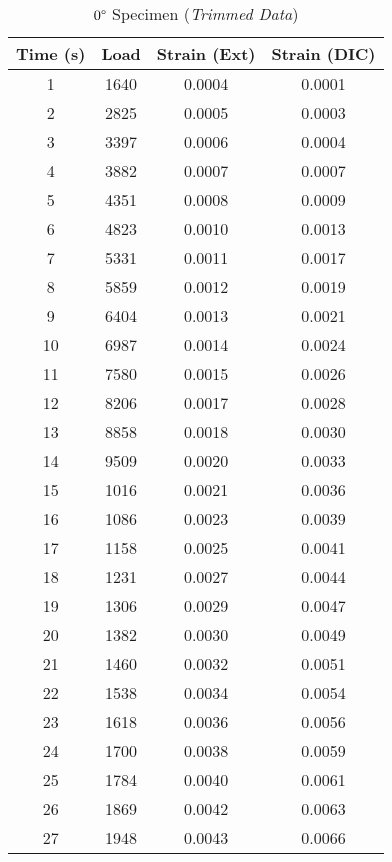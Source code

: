 \begin{table}[!h]
    \centering
    \caption{$0\degree$ Specimen (\textit{Trimmed Data})}
    \begin{tabular}{|c||c|c|c|}\toprule
        \textbf{Time (s)} & \textbf{Load} & \textbf{Strain (Ext)} & \textbf{Strain (DIC)}\\\midrule
        1 & 1640 & 0.0004 & 0.0001 \\\hline
        2 & 2825 & 0.0005 & 0.0003 \\\hline
        3 & 3397 & 0.0006 & 0.0004 \\\hline
        4 & 3882 & 0.0007 & 0.0007 \\\hline
        5 & 4351 & 0.0008 & 0.0009 \\\hline
        6 & 4823 & 0.0010 & 0.0013 \\\hline
        7 & 5331 & 0.0011 & 0.0017 \\\hline
        8 & 5859 & 0.0012 & 0.0019 \\\hline
        9 & 6404 & 0.0013 & 0.0021 \\\hline
        10 & 6987 & 0.0014 & 0.0024 \\\hline
        11 & 7580 & 0.0015 & 0.0026 \\\hline
        12 & 8206 & 0.0017 & 0.0028 \\\hline
        13 & 8858 & 0.0018 & 0.0030 \\\hline
        14 & 9509 & 0.0020 & 0.0033 \\\hline
        15 & 1016 & 0.0021 & 0.0036 \\\hline
        16 & 1086 & 0.0023 & 0.0039 \\\hline
        17 & 1158 & 0.0025 & 0.0041 \\\hline
        18 & 1231 & 0.0027 & 0.0044 \\\hline
        19 & 1306 & 0.0029 & 0.0047 \\\hline
        20 & 1382 & 0.0030 & 0.0049 \\\hline
        21 & 1460 & 0.0032 & 0.0051 \\\hline
        22 & 1538 & 0.0034 & 0.0054 \\\hline
        23 & 1618 & 0.0036 & 0.0056 \\\hline
        24 & 1700 & 0.0038 & 0.0059 \\\hline
        25 & 1784 & 0.0040 & 0.0061 \\\hline
        26 & 1869 & 0.0042 & 0.0063 \\\hline
        27 & 1948 & 0.0043 & 0.0066 \\\hline

\end{tabular}
\end{table}

